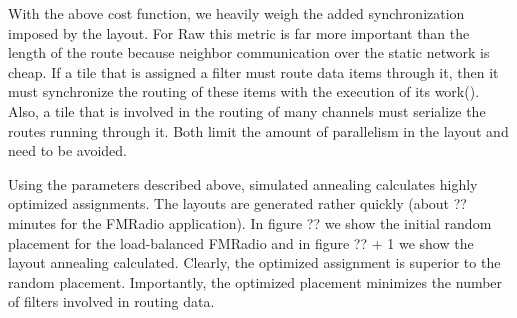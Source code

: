 With the above cost function, we heavily weigh the added
synchronization imposed by the layout.  For Raw this metric is far
more important than the length of the route because neighbor
communication over the static network is cheap.  If a tile that is
assigned a filter must route data items through it, then it must
synchronize the routing of these items with the execution of its
work().  Also, a tile that is involved in the routing of many
channels must serialize the routes running through it.  Both limit
the amount of parallelism in the layout and need to be avoided.

Using the parameters described above, simulated annealing calculates
highly optimized assignments.  The layouts are generated rather
quickly (about ?? minutes for the FMRadio application).  In figure ?? 
we show the initial random placement for the load-balanced FMRadio and
in figure ?? + 1 we show the layout annealing calculated.  Clearly,
the optimized assignment is superior to the random placement.
Importantly, the optimized placement minimizes the number of filters
involved in routing data.
